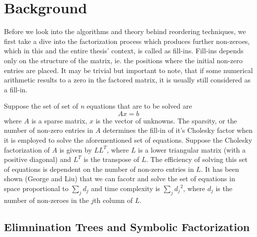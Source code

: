 \chapter{Background}
\label{ch:background}



Before we look into the algorithms and theory behind reordering techniques, we first take a dive into the factorization process which produces further non-zeroes, which in this and the entire thesis' context, is called as fill-ins. Fill-ins depends only on the structure of the matrix, ie. the positions where the initial non-zero entries are placed. It may be trivial but important to note, that if some numerical arithmetic results to a zero in the factored matrix, it is usually still considered as a fill-in. 

Suppose the set of set of \textit{n} equations that are to be solved are
\begin{equation}
    Ax = b
\end{equation}
where \(A\) is a sparse matrix, \(x\) is the vector of unknowns. The sparsity, or the number of non-zero entries in \(A\) determines the fill-in of it's Cholesky factor when it is employed to solve the aforementioned set of equations. 
Suppose the Cholesky factorization of \(A\) is given by \(LL^T\), where \(L\) is a lower triangular matrix (with a positive diagonal) and \(L^T\) is the transpose of \(L\). The efficiency of solving this set of equations is dependent on the number of non-zero entries in \(L\). It has been shown (George and Liu) that we can facotr and solve the set of equations in space proportional to  \(\sum_j d_j\) and time complexity is  \(\sum_j {d_j}^2\), where \(d_j\) is the number of non-zeroes in the \(j\)th column of \(L\).



\section{Elimnination Trees and Symbolic Factorization}
\label{sec:elim_tree}

